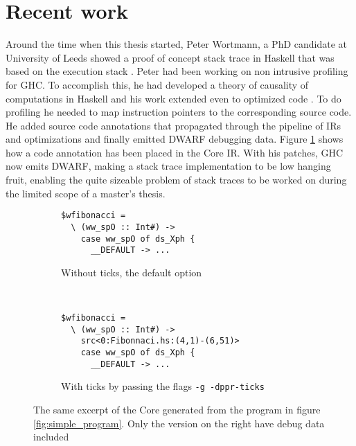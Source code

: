 \section{Recent work} \label{sec:recent_work}

Around the time when this thesis started, Peter Wortmann, a
PhD candidate at University of Leeds showed a proof of concept
stack trace in Haskell that was based on the execution stack
\cite{stack_traces_ticket}. Peter had been working on non intrusive
profiling for GHC. To accomplish this, he had developed a theory of
causality of computations in Haskell and his work extended even to
optimized code \cite{DBLP:conf/haskell/WortmannD13}. To do profiling
he needed to map instruction pointers to the corresponding source
code. He added source code annotations that propagated
through the pipeline of IRs and optimizations and finally emitted DWARF
debugging data. Figure \ref{fig:core_and_ticks} shows how a code
annotation has been placed in the Core IR. With his patches, GHC now
emits DWARF, making a stack trace implementation to be low hanging
fruit, enabling the quite sizeable problem of stack traces to be worked
on during the limited scope of a master's thesis.

\begin{figure}
\begin{mdframed}
        \begin{subfigure}[t]{0.4\textwidth}
            \begin{verbatim}
$wfibonacci =
  \ (ww_spO :: Int#) ->
    case ww_spO of ds_Xph {
      __DEFAULT -> ...
            \end{verbatim}
            \caption{Without ticks, the default option}
        \end{subfigure}
        ~ %
        \begin{subfigure}[t]{0.6\textwidth}
          \begin{verbatim}
$wfibonacci =
  \ (ww_spO :: Int#) ->
    src<0:Fibonnaci.hs:(4,1)-(6,51)>
    case ww_spO of ds_Xph {
      __DEFAULT -> ...
          \end{verbatim}
          \caption{With ticks by passing the flags \texttt{-g -dppr-ticks}}
        \end{subfigure}
        \caption{The same excerpt of the Core generated from the program
in figure \ref{fig:simple_program}. Only the version on the right have
debug data included }\label{fig:core_and_ticks}
\end{mdframed}
\end{figure}

